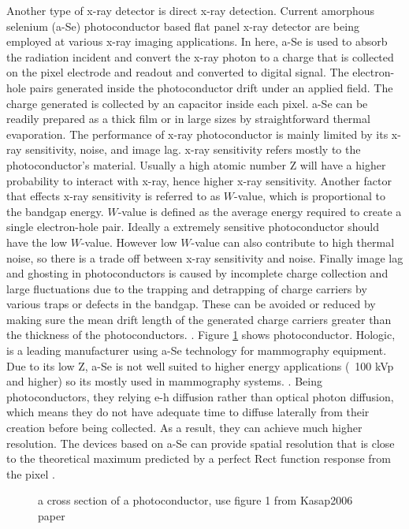 Another type of x-ray detector is direct x-ray detection.  Current amorphous selenium (a-Se) photoconductor based flat panel x-ray detector are being employed at various x-ray imaging applications.  In here, a-Se is used to absorb the radiation incident and convert the x-ray photon to a charge that is collected on the pixel electrode and readout and converted to digital signal.  The electron-hole pairs generated inside the photoconductor drift under an applied field.  The charge generated is collected by an capacitor inside each pixel.
a-Se can be readily prepared as a thick film or in large sizes by straightforward thermal evaporation.  The performance of x-ray photoconductor is mainly limited by its x-ray sensitivity, noise, and image lag.  x-ray sensitivity refers mostly to the photoconductor's material.  Usually a high atomic number Z will have a higher probability to interact with x-ray, hence higher x-ray sensitivity.  Another factor that effects x-ray sensitivity is referred to as $W$-value, which is proportional to the bandgap energy.  $W$-value is defined as the average energy required to create a single electron-hole pair.  Ideally a extremely sensitive photoconductor should have the low $W$-value.  However low $W$-value can also contribute to high thermal noise, so there is a trade off between x-ray sensitivity and noise.  Finally image lag and ghosting in photoconductors is caused by incomplete charge collection and large fluctuations due to the trapping and detrapping of charge carriers by various traps or defects in the bandgap.  These can be avoided or reduced by making sure the mean drift length of the generated charge carriers greater than the thickness of the photoconductors.\cite{Kim2008} \cite{kasap2006} \cite{belev2004}.  Figure \ref{fig:photoconductor_cross_section} shows photoconductor.  Hologic, is a leading manufacturer using a-Se technology for mammography equipment.
Due to its low Z, a-Se is not well suited to higher energy applications (~100 kVp and higher) so its mostly used in mammography systems.  \cite{Yorkston2007}.
Being photoconductors, they relying e-h diffusion rather than optical photon diffusion, which means they do not have adequate time to diffuse laterally from their creation before being collected.  As a result, they can achieve much higher resolution.  The devices based on a-Se can provide spatial resolution that is close to the theoretical maximum predicted by a perfect Rect function response from the pixel \cite{hunt5030}.  


\begin{figure}
\centering
{}
\caption{a cross section of a photoconductor, use figure 1 from Kasap2006 paper}
\label{fig:photoconductor_cross_section}
\end{figure}


